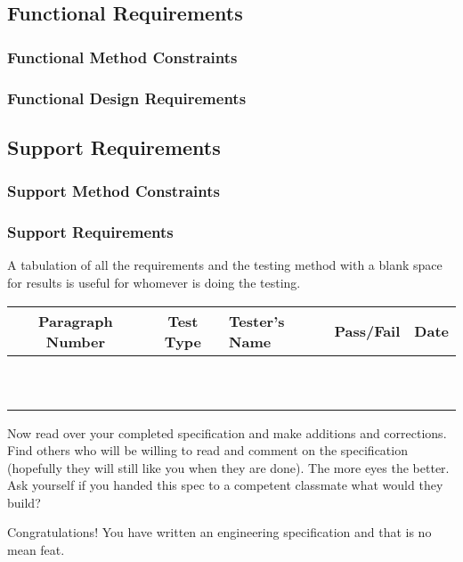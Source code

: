 \subsection{Functional Requirements}

\subsubsection{Functional Method Constraints}

\subsubsection{Functional Design Requirements}

\subsection{Support Requirements}

\subsubsection{Support Method Constraints}

\subsubsection{Support Requirements} 


\begin{slshape}
	\color{blue}
  A tabulation of all the requirements and the testing method with a blank space for results is useful for whomever is doing the testing.
\end{slshape}

\begin{table}[h]
\centering
\begin{tabular}{|c|c|C{6cm}|c|c|}
\hline
\textbf{Paragraph Number} & \textbf{Test Type}& 
\textbf{Tester's Name} & \textbf{Pass/Fail} & \textbf{Date} \\
\hline
 & & & & \\
\hline
 & & & & \\
\hline
 & & & & \\
\hline
 & & & & \\
\hline
 & & & & \\
\hline
 & & & & \\
\hline
 & & & & \\
\hline
 & & & & \\
\hline
 & & & & \\
\hline
 & & & & \\
\hline
\end{tabular}
\end{table}

\begin{slshape}
\color{blue}
\StopSign Now read over your completed specification and make additions and corrections.  Find others who will be willing to read and comment on the specification (hopefully they will still like you when they are done).  The more eyes the better.  Ask yourself if you handed this spec to a competent classmate what would they build?
\bigskip

Congratulations!  You have written an engineering specification and that is no mean feat.
\end{slshape}